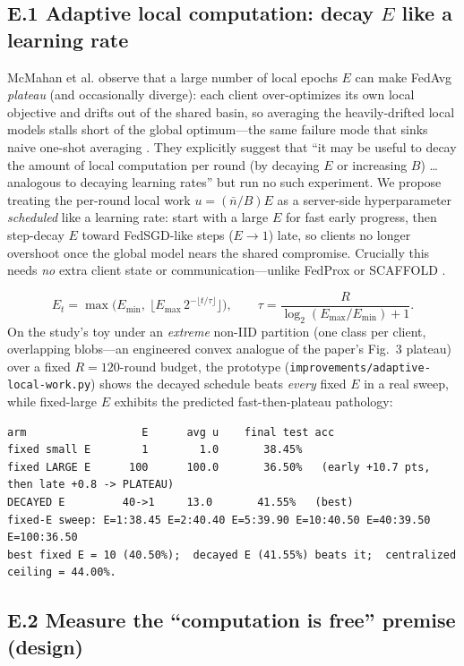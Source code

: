 \documentclass[11pt]{article}
\begin{document}
\subsection*{E.1 Adaptive local computation: decay $E$ like a learning rate}

McMahan et al. observe that a large number of local epochs $E$ can make FedAvg \emph{plateau} (and occasionally diverge): each client over-optimizes its own local objective and drifts out of the shared basin, so averaging the heavily-drifted local models stalls short of the global optimum---the same failure mode that sinks naive one-shot averaging \citep{zhang2012communication}. They explicitly suggest that ``it may be useful to decay the amount of local computation per round (by decaying $E$ or increasing $B$) \dots analogous to decaying learning rates'' but run no such experiment. We propose treating the per-round local work $u=(\bar n/B)E$ as a server-side hyperparameter \emph{scheduled} like a learning rate: start with a large $E$ for fast early progress, then step-decay $E$ toward FedSGD-like steps ($E\!\to\!1$) late, so clients no longer overshoot once the global model nears the shared compromise. Crucially this needs \emph{no} extra client state or communication---unlike FedProx \citep{li2020fedprox} or SCAFFOLD \citep{karimireddy2020scaffold}.

$$ E_t = \max\!\Big(E_{\min},\ \big\lfloor E_{\max}\,2^{-\lfloor t/\tau \rfloor} \big\rfloor\Big),\qquad \tau = \frac{R}{\log_2(E_{\max}/E_{\min})+1}. $$
On the study's toy under an \emph{extreme} non-IID partition (one class per client, overlapping blobs---an engineered convex analogue of the paper's Fig.~3 plateau) over a fixed $R{=}120$-round budget, the prototype (\texttt{improvements/adaptive-local-work.py}) shows the decayed schedule beats \emph{every} fixed $E$ in a real sweep, while fixed-large $E$ exhibits the predicted fast-then-plateau pathology:

\begin{lstlisting}
arm                  E      avg u    final test acc
fixed small E        1        1.0       38.45%
fixed LARGE E      100      100.0       36.50%   (early +10.7 pts, then late +0.8 -> PLATEAU)
DECAYED E         40->1     13.0       41.55%   (best)
fixed-E sweep: E=1:38.45 E=2:40.40 E=5:39.90 E=10:40.50 E=40:39.50 E=100:36.50
best fixed E = 10 (40.50%);  decayed E (41.55%) beats it;  centralized ceiling = 44.00%.
\end{lstlisting}

\subsection*{E.2 Measure the ``computation is free'' premise (design)}
\end{document}
